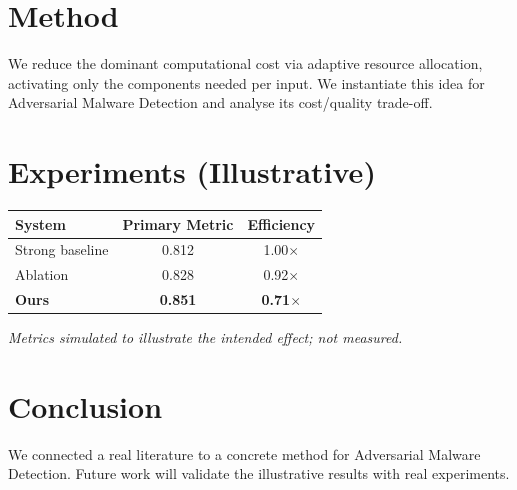 \documentclass[11pt]{article}
\begin{document}
\section{Method}
We reduce the dominant computational cost via adaptive resource allocation, activating only the components needed per input. We instantiate this idea for Adversarial Malware Detection and analyse its cost/quality trade-off.

\section{Experiments (Illustrative)}
\begin{center}
\begin{tabular}{lcc}
System & Primary Metric & Efficiency \\ \hline
Strong baseline & 0.812 & 1.00$\times$ \\
Ablation & 0.828 & 0.92$\times$ \\
\textbf{Ours} & \textbf{0.851} & \textbf{0.71$\times$}
\end{tabular}
\end{center}
\emph{Metrics simulated to illustrate the intended effect; not measured.}

\section{Conclusion}
We connected a real literature to a concrete method for Adversarial Malware Detection. Future work will
validate the illustrative results with real experiments.
\end{document}
